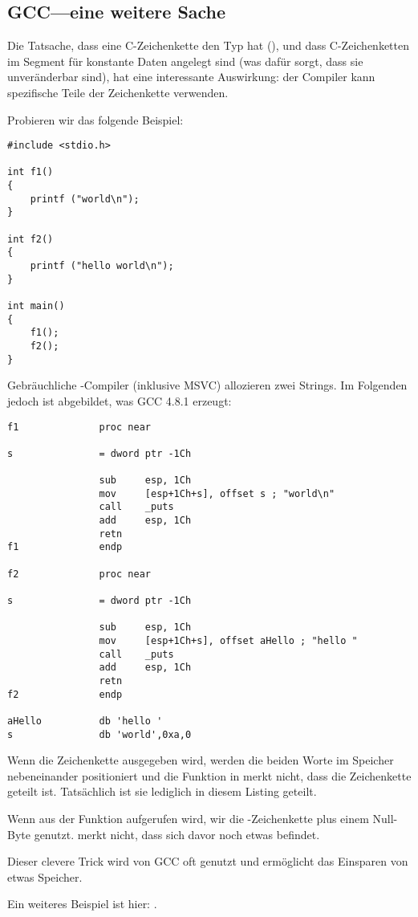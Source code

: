 \subsection{GCC---eine weitere Sache}
\label{use_parts_of_C_strings}

Die Tatsache, dass eine  C-Zeichenkette den Typ  hat (), 
und dass C-Zeichenketten im Segment für konstante Daten angelegt sind (was dafür sorgt, dass sie unveränderbar sind),
hat eine interessante Auswirkung: der Compiler kann spezifische Teile der Zeichenkette verwenden.

Probieren wir das folgende Beispiel:

\begin{lstlisting}
#include <stdio.h>

int f1()
{
	printf ("world\n");
}

int f2()
{
	printf ("hello world\n");
}

int main()
{
	f1();
	f2();
}
\end{lstlisting}

Gebräuchliche \CCpp{}-Compiler (inklusive MSVC) allozieren zwei Strings.
Im Folgenden jedoch ist abgebildet, was GCC 4.8.1 erzeugt:

\begin{lstlisting}[caption=GCC 4.8.1 + IDA listing]
f1              proc near

s               = dword ptr -1Ch

                sub     esp, 1Ch
                mov     [esp+1Ch+s], offset s ; "world\n"
                call    _puts
                add     esp, 1Ch
                retn
f1              endp

f2              proc near

s               = dword ptr -1Ch

                sub     esp, 1Ch
                mov     [esp+1Ch+s], offset aHello ; "hello "
                call    _puts
                add     esp, 1Ch
                retn
f2              endp

aHello          db 'hello '
s               db 'world',0xa,0
\end{lstlisting}

Wenn die Zeichenkette  ausgegeben wird, werden die beiden Worte im Speicher nebeneinander
positioniert und die Funktion \puts in  merkt nicht, dass die Zeichenkette geteilt ist.
Tatsächlich ist sie lediglich  in diesem Listing geteilt.

Wenn \puts aus der Funktion  aufgerufen wird, wir die -Zeichenkette plus einem Null-Byte
genutzt. \puts merkt nicht, dass sich davor noch etwas befindet.

Dieser clevere Trick wird von GCC oft genutzt und ermöglicht das Einsparen von etwas Speicher.

Ein weiteres Beispiel ist hier: .

